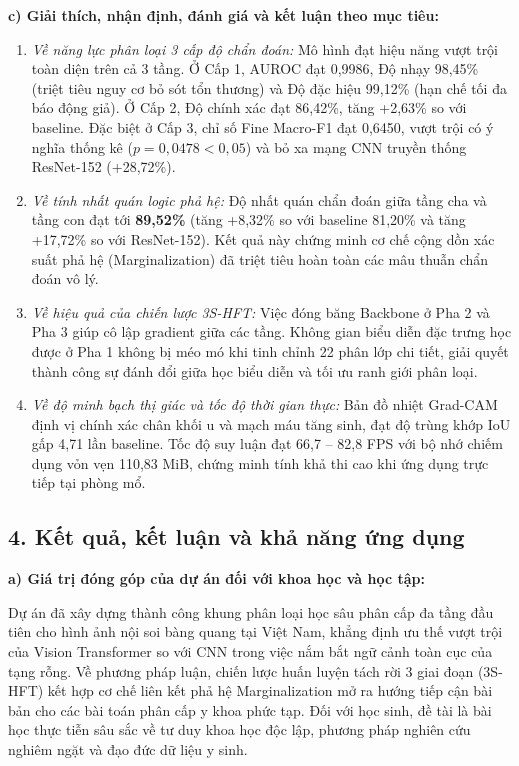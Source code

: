 \documentclass[a4paper]{article}
\begin{document}
\noindent\textbf{c) Giải thích, nhận định, đánh giá và kết luận theo mục tiêu:}
\begin{enumerate}
  \item \textit{Về năng lực phân loại 3 cấp độ chẩn đoán:} Mô hình đạt hiệu năng vượt trội toàn diện trên cả 3 tầng. Ở Cấp 1, AUROC đạt 0,9986, Độ nhạy 98,45\% (triệt tiêu nguy cơ bỏ sót tổn thương) và Độ đặc hiệu 99,12\% (hạn chế tối đa báo động giả). Ở Cấp 2, Độ chính xác đạt 86,42\%, tăng +2,63\% so với baseline. Đặc biệt ở Cấp 3, chỉ số Fine Macro-F1 đạt 0,6450, vượt trội có ý nghĩa thống kê ($p = 0,0478 < 0,05$) và bỏ xa mạng CNN truyền thống ResNet-152 (+28,72\%).
  \item \textit{Về tính nhất quán logic phả hệ:} Độ nhất quán chẩn đoán giữa tầng cha và tầng con đạt tới \textbf{89,52\%} (tăng +8,32\% so với baseline 81,20\% và tăng +17,72\% so với ResNet-152). Kết quả này chứng minh cơ chế cộng dồn xác suất phả hệ (Marginalization) đã triệt tiêu hoàn toàn các mâu thuẫn chẩn đoán vô lý.
  \item \textit{Về hiệu quả của chiến lược 3S-HFT:} Việc đóng băng Backbone ở Pha 2 và Pha 3 giúp cô lập gradient giữa các tầng. Không gian biểu diễn đặc trưng học được ở Pha 1 không bị méo mó khi tinh chỉnh 22 phân lớp chi tiết, giải quyết thành công sự đánh đổi giữa học biểu diễn và tối ưu ranh giới phân loại.
  \item \textit{Về độ minh bạch thị giác và tốc độ thời gian thực:} Bản đồ nhiệt Grad-CAM định vị chính xác chân khối u và mạch máu tăng sinh, đạt độ trùng khớp IoU gấp 4,71 lần baseline. Tốc độ suy luận đạt 66,7 -- 82,8 FPS với bộ nhớ chiếm dụng vỏn vẹn 110,83 MiB, chứng minh tính khả thi cao khi ứng dụng trực tiếp tại phòng mổ.
\end{enumerate}

\subsection*{4. Kết quả, kết luận và khả năng ứng dụng}

\noindent\textbf{a) Giá trị đóng góp của dự án đối với khoa học và học tập:}

Dự án đã xây dựng thành công khung phân loại học sâu phân cấp đa tầng đầu tiên cho hình ảnh nội soi bàng quang tại Việt Nam, khẳng định ưu thế vượt trội của Vision Transformer so với CNN trong việc nắm bắt ngữ cảnh toàn cục của tạng rỗng. Về phương pháp luận, chiến lược huấn luyện tách rời 3 giai đoạn (3S-HFT) kết hợp cơ chế liên kết phả hệ Marginalization mở ra hướng tiếp cận bài bản cho các bài toán phân cấp y khoa phức tạp. Đối với học sinh, đề tài là bài học thực tiễn sâu sắc về tư duy khoa học độc lập, phương pháp nghiên cứu nghiêm ngặt và đạo đức dữ liệu y sinh.
\end{document}
